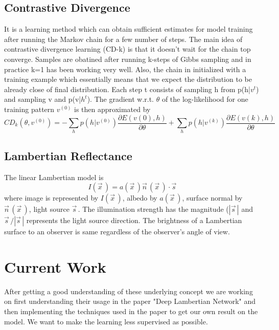 \documentclass{article}
\begin{document}
\subsection{Contrastive Divergence}
It is a learning method which can obtain sufficient estimates for model training after running the Markov chain for a few number of steps. The main idea of  contrastive divergence learning (CD-k) is that it doesn't wait for the chain top converge. Samples are obatined after running k-steps of Gibbs sampling and in practice k=1 has been working very well. Also, the chain in initialized with a training example which essentially means that we expect the distribution to be already close of final distribution. Each step t consists of sampling h from p(h|$v^t$) and sampling v and p(v|$h^t$). The gradient w.r.t. $\theta$ of the log-likelihood for one training pattern $v^{(0)}$ is then approximated by
\begin{equation}
CD_k(\theta, v^{(0)}) = -\sum_h p(h|v^{(0)}) \frac{\partial E(v(0), h)}{\partial \theta} +\sum_h p(h|v^{(k)}) \frac{ \partial E(v(k), h)}{\partial \theta} 
\end{equation}

\subsection{Lambertian Reflectance}
The linear Lambertian model is
\begin{equation}
I(\vec{x}^{\,}) = a(\vec{x}^{\,})\vec{n}^{\,}(\vec{x}^{\,}) \cdot \vec{s}^{\,}
\end{equation}
where image is represented by $I(\vec{x}^{\,})$, albedo by $a(\vec{x}^{\,})$, surface normal by $\vec{n}^{\,}(\vec{x}^{\,}) $, light source $\vec{s}^{\,}$. The illumination strength has the magnitude ($|\vec{s}^{\,}|$ and $\vec{s}^{\,}/|\vec{s}^{\,}|$ represents the light source direction. The brightness of a Lambertian surface to an observer is same regardless of the observer's angle of view.

\section{Current Work}
After getting a good understanding of these underlying concept we are working on first understanding their usage in the paper "Deep Lambertian Network"\cite{dln} and then implementing the techniques used in the paper to get our own result on the model. We want to make the learning less supervised as possible. 
\end{document}
